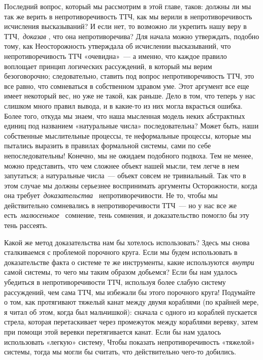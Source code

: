 \documentclass[../main.tex]{subfiles}
\begin{document}
Последний вопрос, который мы рассмотрим в этой главе, таков: должны ли мы так же верить в непротиворечивость ТТЧ, как мы верили в непротиворечивость исчисления высказываний? И если нет, то возможно ли укрепить нашу веру в ТТЧ,~\emph{доказав} , что она непротиворечива? Для начала можно утверждать, подобно тому, как Неосторожность утверждала об исчислении высказываний, что непротиворечивость ТТЧ «очевидна»~--- а именно, что каждое правило воплощает принцип логических рассуждений, в который мы верим безоговорочно; следовательно, ставить под вопрос непротиворечивость ТТЧ, это все равно, что сомневаться в собственном здравом уме. Этот аргумент все еще имеет некоторый вес, но уже не такой, как раньше. Дело в том, что теперь у нас слишком много правил вывода, и в какие-то из них могла вкрасться ошибка. Более того, откуда мы знаем, что наша мысленная модель неких абстрактных единиц под названием «натуральные числа» последовательна? Может быть, наши собственные мыслительные процессы, те неформальные процессы, которые мы пытались выразить в правилах формальной системы, сами по себе непоследовательны! Конечно, мы не ожидаем подобного подвоха. Тем не менее, можно представить, что чем сложнее объект нашей мысли, тем легче в нем запутаться; а натуральные числа~--- объект совсем не тривиальный. Так что в этом случае мы должны серьезнее воспринимать аргументы Осторожности, когда она требует~\emph{доказательства~} непротиворечивости. Не то, чтобы мы действительно сомневались в непротиворечивости ТТЧ~--- но у нас все же есть~\emph{малюсенькое~} сомнение, тень сомнения, и доказательство помогло бы эту тень рассеять.

Какой же метод доказательства нам бы хотелось использовать? Здесь мы снова сталкиваемся с проблемой порочного круга. Если мы будем использовать в доказательстве факта о системе те же инструменты, какие используются~\emph{внутри~} самой системы, то чего мы таким образом добьемся? Если бы нам удалось убедиться в непротиворечивости ТТЧ, используя более слабую систему рассуждений, чем сама ТТЧ, мы избежали бы этого порочного круга! Подумайте о том, как протягивают тяжелый канат между двумя кораблями (по крайней мере, я читал об этом, когда был мальчишкой): сначала с одного из кораблей пускается стрела, которая перетаскивает через промежуток между кораблями веревку, затем при помощи этой веревки перетягивается канат. Если бы нам удалось использовать «легкую» систему, Чтобы показать непротиворечивость «тяжелой» системы, тогда мы могли бы считать, что действительно чего-то добились.
\end{document}
